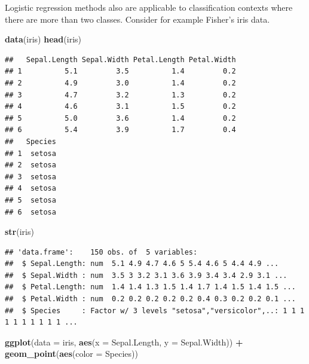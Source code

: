 \documentclass[
]{krantz}
\newenvironment{Shaded}{\begin{snugshade}}{\end{snugshade}}
\newcommand{\DataTypeTok}[1]{\textcolor[rgb]{0.13,0.29,0.53}{#1}}
\newcommand{\KeywordTok}[1]{\textcolor[rgb]{0.13,0.29,0.53}{\textbf{#1}}}
\newcommand{\NormalTok}[1]{#1}
\newcommand{\OperatorTok}[1]{\textcolor[rgb]{0.81,0.36,0.00}{\textbf{#1}}}
\newcommand{\StringTok}[1]{\textcolor[rgb]{0.31,0.60,0.02}{#1}}
\begin{document}
Logistic regression methods also are applicable to classification contexts where there are more than two classes. Consider for example Fisher's iris data.

\begin{Shaded}
\begin{Highlighting}[]
\KeywordTok{data}\NormalTok{(iris)}
\KeywordTok{head}\NormalTok{(iris)}
\end{Highlighting}
\end{Shaded}

\begin{verbatim}
##   Sepal.Length Sepal.Width Petal.Length Petal.Width
## 1          5.1         3.5          1.4         0.2
## 2          4.9         3.0          1.4         0.2
## 3          4.7         3.2          1.3         0.2
## 4          4.6         3.1          1.5         0.2
## 5          5.0         3.6          1.4         0.2
## 6          5.4         3.9          1.7         0.4
##   Species
## 1  setosa
## 2  setosa
## 3  setosa
## 4  setosa
## 5  setosa
## 6  setosa
\end{verbatim}

\begin{Shaded}
\begin{Highlighting}[]
\KeywordTok{str}\NormalTok{(iris)}
\end{Highlighting}
\end{Shaded}

\begin{verbatim}
## 'data.frame':    150 obs. of  5 variables:
##  $ Sepal.Length: num  5.1 4.9 4.7 4.6 5 5.4 4.6 5 4.4 4.9 ...
##  $ Sepal.Width : num  3.5 3 3.2 3.1 3.6 3.9 3.4 3.4 2.9 3.1 ...
##  $ Petal.Length: num  1.4 1.4 1.3 1.5 1.4 1.7 1.4 1.5 1.4 1.5 ...
##  $ Petal.Width : num  0.2 0.2 0.2 0.2 0.2 0.4 0.3 0.2 0.2 0.1 ...
##  $ Species     : Factor w/ 3 levels "setosa","versicolor",..: 1 1 1 1 1 1 1 1 1 1 ...
\end{verbatim}

\begin{Shaded}
\begin{Highlighting}[]
\KeywordTok{ggplot}\NormalTok{(}\DataTypeTok{data =}\NormalTok{ iris, }\KeywordTok{aes}\NormalTok{(}\DataTypeTok{x =}\NormalTok{ Sepal.Length, }\DataTypeTok{y =}\NormalTok{ Sepal.Width)) }\OperatorTok{+}\StringTok{ }
\StringTok{  }\KeywordTok{geom\_point}\NormalTok{(}\KeywordTok{aes}\NormalTok{(}\DataTypeTok{color =}\NormalTok{ Species))}
\end{Highlighting}
\end{Shaded}
\end{document}
